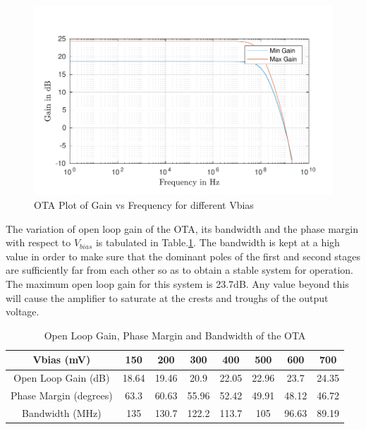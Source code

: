 \begin{figure} [H]
\centering
\includegraphics[scale=1]{Figures/Plots/OTA_Gain.pdf}
\caption{OTA Plot of Gain vs Frequency for different Vbias}
\label{fig:OTA_Gain}
\end{figure}

The variation of open loop gain of the OTA, its bandwidth and the phase margin with respect to $V_{bias}$ is tabulated in Table.\ref{tab:OTA_gain_bw_pm}. The bandwidth is kept at a high value in order to make sure that the dominant poles of the first and second stages are sufficiently far from each other so as to obtain a stable system for operation. The maximum open loop gain for this system is 23.7dB. Any value beyond this will cause the amplifier to saturate at the crests and troughs of the output voltage.

\begin{table} [H]
\centering
\begin{tabular}{@{}cccccccc@{}}
\toprule
Vbias (mV)					& 150		& 200		& 300		& 400		& 500		& 600		& 700 \\ \midrule
Open Loop Gain (dB)			& 18.64		& 19.46		& 20.9		& 22.05		& 22.96		& 23.7		& 24.35 \\
Phase Margin (degrees)		& 63.3		& 60.63		& 55.96		& 52.42		& 49.91		& 48.12		& 46.72 \\
Bandwidth (MHz)				& 135		& 130.7		& 122.2		& 113.7		& 105		& 96.63		& 89.19 \\
\bottomrule
\end{tabular}
\caption{Open Loop Gain, Phase Margin and Bandwidth of the OTA}
\label{tab:OTA_gain_bw_pm}
\end{table}

